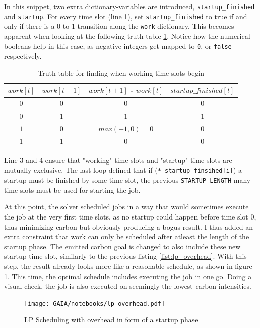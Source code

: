 In this snippet, two extra dictionary-variables are introduced, \verb|startup_finished| and \verb|startup|.
For every time slot (line 1), set \verb|startup_finished| to true if and only if there is a 0 to 1 transition along the \verb|work| dictionary. This becomes apparent when looking at the following truth table \ref{tab:truth_table_startup_finished}.
Notice how the numerical booleans help in this case, as negative integers get mapped to \verb|0|, or \verb|false| respectively.

\begin{table}[h!]
\centering
\begin{tabular}{|c|c|c|c|}
\hline
    $work[t]$ & $work[t+1]$ & $work[t+1]$ - $work[t]$ & $startup\_finished[t]$ \\ \hline
    $0$ & $0$ & $0$ & $0$ \\ \hline
    $0$ & $1$ & $1$ & $1$ \\ \hline
    $1$ & $0$ & $max(-1, 0) = 0$ & $0$ \\ \hline
    $1$ & $1$ & $0$ & $0$ \\ \hline
\end{tabular}
\caption{Truth table for finding when working time slots begin}
\label{tab:truth_table_startup_finished}
\end{table}

Line 3 and 4 ensure that "working" time slots and "startup" time slots are mutually exclusive.
The last loop defined that if (\verb|* startup_finsihed[i]|) a startup must be finished by some time slot, the previous \verb|STARTUP_LENGTH|-many time slots must be used for starting the job.

At this point, the solver scheduled jobs in a way that would sometimes execute the job at the very first time slots, as no startup could happen before time slot $0$, thus minimizing carbon but obviously producing a bogus result.
I thus added an extra constraint that work can only be scheduled after atleast the length of the startup phase.
The emitted carbon goal is changed to also include these new startup time slot, similarly to the previous listing \ref{list:lp_overhead}.
With this step, the result already looks more like a reasonable schedule, as shown in figure \ref{fig:lp_overhead}. 
This time, the optimal schedule includes executing the job in one go.
Doing a visual check, the job is also executed on seemingly the lowest carbon intensities.

\begin{figure}
    \texttt{[image: GAIA/notebooks/lp\_overhead.pdf]}
    \caption{LP Scheduling with overhead in form of a startup phase}
    \label{fig:lp_overhead}
\end{figure}

